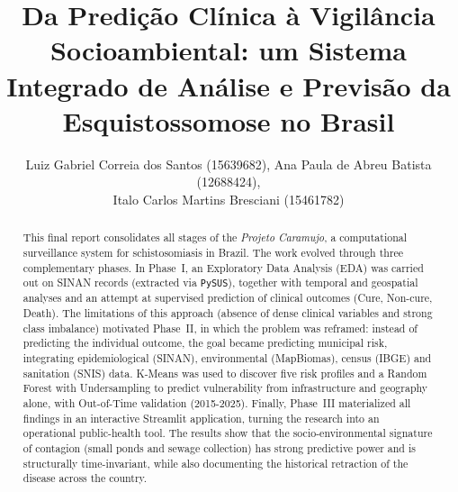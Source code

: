 \documentclass[12pt]{article}
\title{Da Predição Clínica à Vigilância Socioambiental: um Sistema
Integrado de Análise e Previsão da Esquistossomose no Brasil}
\author{Luiz Gabriel Correia dos Santos (15639682)\inst{1},
Ana Paula de Abreu Batista (12688424)\inst{1},\\
Italo Carlos Martins Bresciani (15461782)\inst{1}}
\begin{document}
\maketitle

\begin{abstract}
This final report consolidates all stages of the \textit{Projeto Caramujo}, a
computational surveillance system for schistosomiasis in Brazil. The work evolved
through three complementary phases. In Phase~I, an Exploratory Data Analysis (EDA)
was carried out on SINAN records (extracted via \texttt{PySUS}), together with
temporal and geospatial analyses and an attempt at supervised prediction of clinical
outcomes (Cure, Non-cure, Death). The limitations of this approach (absence of dense
clinical variables and strong class imbalance) motivated Phase~II, in which the
problem was reframed: instead of predicting the individual outcome, the goal became
predicting municipal risk, integrating epidemiological (SINAN), environmental
(MapBiomas), census (IBGE) and sanitation (SNIS) data. K-Means was used to discover
five risk profiles and a Random Forest with Undersampling to predict vulnerability
from infrastructure and geography alone, with Out-of-Time validation (2015-2025).
Finally, Phase~III materialized all findings in an interactive Streamlit application,
turning the research into an operational public-health tool. The results show that
the socio-environmental signature of contagion (small ponds and sewage collection)
has strong predictive power and is structurally time-invariant, while also documenting
the historical retraction of the disease across the country.
\end{abstract}
\end{document}
